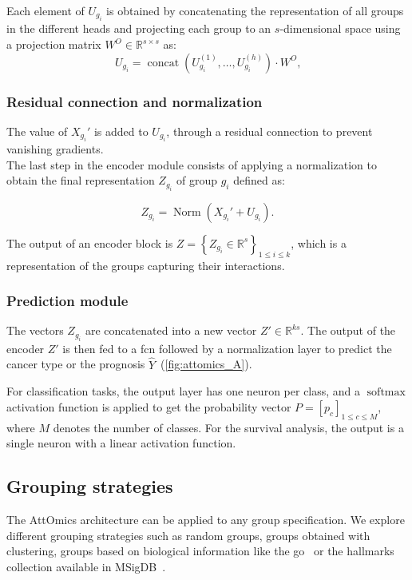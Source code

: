 \documentclass[../main.tex]{subfiles}
\begin{document}
Each element of $U_{g_i}$ is obtained by concatenating the representation of all groups in the different heads and projecting each group to an $s$-dimensional space using a projection matrix $W^O \in \mathbb{R}^{s\times s}$ as:
\[ U_{g_i} = \operatorname{concat}\left( U^{(1)}_{g_i}, \ldots, U^{(h)}_{g_i} \right) \cdot W^O \text{,}\]
\subsubsection{Residual connection and normalization}
The value of $X_{g_i}'$ is added to $U_{g_i}$, through a residual connection to prevent vanishing gradients.\\
The last step in the encoder module consists of applying a normalization to obtain the final representation $Z_{g_i}$ of group $g_i$ defined as:

\[Z_{g_i} = \operatorname{Norm}\left(X_{g_i}' + U_{g_i} \right) \text{.}\]

The output of an encoder block is $Z = \left\{ Z_{g_i} \in \mathbb{R}^{s}\right\}_{1 \leq i \leq k}$, which is a representation of the groups capturing their interactions.

\subsubsection{Prediction module}
The vectors $Z_{g_i}$ are concatenated into a new vector $Z' \in \mathbb{R}^{ks}$.
The output of the encoder $Z'$ is then fed to a \gls{fcn} followed by a normalization layer to predict the cancer type or the prognosis $\hat{Y}$~(\cref{fig:attomics_A}).

For classification tasks,  the output layer has one neuron per class, and a $\operatorname{softmax}$ activation function is applied to get the probability vector $P = \left[p_c\right]_{1\leq c\leq M}$, where $M$ denotes the number of classes.
For the survival analysis, the output is a single neuron with a linear activation function.

\subsection{Grouping strategies}\label{sec:grouping}

The AttOmics architecture can be applied to any group specification.
We explore different grouping strategies such as random groups, groups obtained with clustering, groups based on biological information like the \gls{go}~\cite{geneontologyconsortiumGeneOntologyResource2021} or the hallmarks collection available in MSigDB~\cite{Liberzon2015}.
\end{document}
